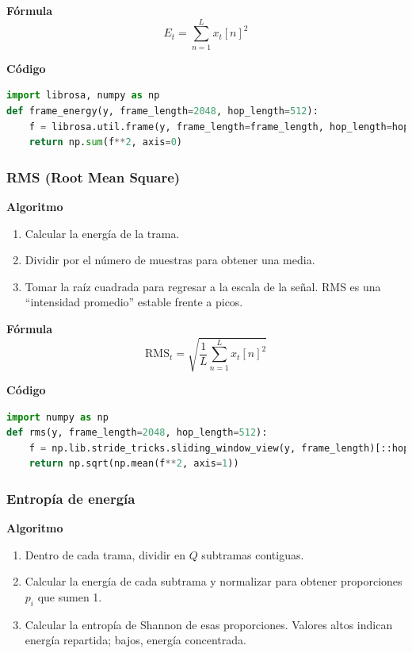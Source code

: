 \textbf{Fórmula}
\[
  E_t = \sum_{n=1}^{L} x_t[n]^2
\]

\textbf{Código}
\begin{lstlisting}[language=Python, label={lst:energy_code}, caption={Energía por tramas}]
import librosa, numpy as np
def frame_energy(y, frame_length=2048, hop_length=512):
    f = librosa.util.frame(y, frame_length=frame_length, hop_length=hop_length)
    return np.sum(f**2, axis=0)
\end{lstlisting}

\subsubsection{RMS (Root Mean Square)}
\textbf{Algoritmo} \parencite{oppenheim2010dsp, muller2015fmp}
\begin{enumerate}
  \item Calcular la energía de la trama.
  \item Dividir por el número de muestras para obtener una media.
  \item Tomar la raíz cuadrada para regresar a la escala de la señal. RMS es una “intensidad promedio” estable frente a picos.
\end{enumerate}

\textbf{Fórmula}
\[
  \text{RMS}_t=\sqrt{\frac{1}{L}\sum_{n=1}^{L}x_t[n]^2}
\]

\textbf{Código}
\begin{lstlisting}[language=Python, label={lst:rms_code}, caption={RMS por tramas}]
import numpy as np
def rms(y, frame_length=2048, hop_length=512):
    f = np.lib.stride_tricks.sliding_window_view(y, frame_length)[::hop_length]
    return np.sqrt(np.mean(f**2, axis=1))
\end{lstlisting}

\subsubsection{Entropía de energía}
\textbf{Algoritmo} \parencite{peeters2004large, giannakopoulos2014intro}
\begin{enumerate}
  \item Dentro de cada trama, dividir en \(Q\) subtramas contiguas.
  \item Calcular la energía de cada subtrama y normalizar para obtener proporciones \(p_i\) que sumen 1.
  \item Calcular la entropía de Shannon de esas proporciones. Valores altos indican energía repartida; bajos, energía concentrada.
\end{enumerate}

